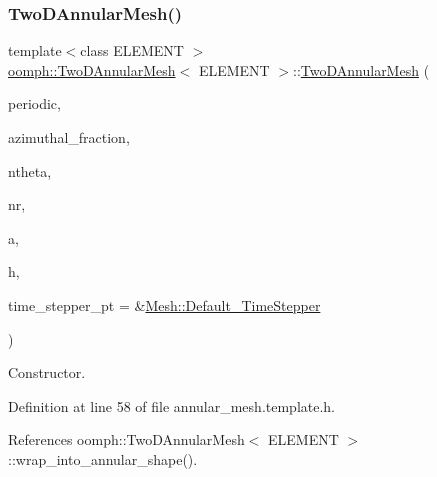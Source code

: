\subsubsection{\texorpdfstring{Two\+D\+Annular\+Mesh()}{TwoDAnnularMesh()}\hspace{0.1cm}{\footnotesize\ttfamily [1/2]}}
{\footnotesize\ttfamily template$<$class E\+L\+E\+M\+E\+NT $>$ \\
\hyperlink{classoomph_1_1TwoDAnnularMesh}{oomph\+::\+Two\+D\+Annular\+Mesh}$<$ E\+L\+E\+M\+E\+NT $>$\+::\hyperlink{classoomph_1_1TwoDAnnularMesh}{Two\+D\+Annular\+Mesh} (\begin{DoxyParamCaption}\item[{const bool \&}]{periodic,  }\item[{const double \&}]{azimuthal\+\_\+fraction,  }\item[{const unsigned \&}]{ntheta,  }\item[{const unsigned \&}]{nr,  }\item[{const double \&}]{a,  }\item[{const double \&}]{h,  }\item[{\hyperlink{classoomph_1_1TimeStepper}{Time\+Stepper} $\ast$}]{time\+\_\+stepper\+\_\+pt = {\ttfamily \&\hyperlink{classoomph_1_1Mesh_a12243d0fee2b1fcee729ee5a4777ea10}{Mesh\+::\+Default\+\_\+\+Time\+Stepper}} }\end{DoxyParamCaption})\hspace{0.3cm}{\ttfamily [inline]}}



Constructor. 



Definition at line 58 of file annular\+\_\+mesh.\+template.\+h.



References oomph\+::\+Two\+D\+Annular\+Mesh$<$ E\+L\+E\+M\+E\+N\+T $>$\+::wrap\+\_\+into\+\_\+annular\+\_\+shape().

\mbox{\label{classoomph_1_1TwoDAnnularMesh_a2d67eba43c6355893c7a95208068d387}} 
